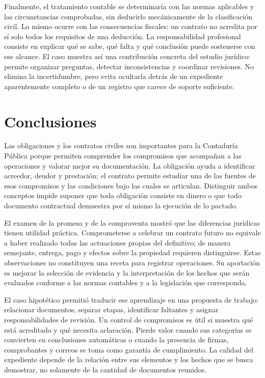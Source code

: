{Finalmente, el tratamiento contable se determinaría con las normas aplicables y las circunstancias comprobadas, sin deducirlo mecánicamente de la clasificación civil. Lo mismo ocurre con las consecuencias fiscales: un contrato no acredita por sí solo todos los requisitos de una deducción. La responsabilidad profesional consiste en explicar qué se sabe, qué falta y qué conclusión puede sostenerse con ese alcance. El caso muestra así una contribución concreta del estudio jurídico: permite organizar preguntas, detectar inconsistencias y coordinar revisiones. No elimina la incertidumbre, pero evita ocultarla detrás de un expediente aparentemente completo o de un registro que carece de soporte suficiente.

\clearpage
\section*{Conclusiones}

Las obligaciones y los contratos civiles son importantes para la Contaduría Pública porque permiten comprender los compromisos que acompañan a las operaciones y valorar mejor su documentación. La obligación ayuda a identificar acreedor, deudor y prestación; el contrato permite estudiar una de las fuentes de esos compromisos y las condiciones bajo las cuales se articulan. Distinguir ambos conceptos impide suponer que toda obligación consiste en dinero o que todo documento contractual demuestra por sí mismo la ejecución de lo pactado.

El examen de la promesa y de la compraventa mostró que las diferencias jurídicas tienen utilidad práctica. Comprometerse a celebrar un contrato futuro no equivale a haber realizado todas las actuaciones propias del definitivo; de manera semejante, entrega, pago y efectos sobre la propiedad requieren distinguirse. Estas observaciones no constituyen una receta para registrar operaciones. Su aportación es mejorar la selección de evidencia y la interpretación de los hechos que serán evaluados conforme a las normas contables y a la legislación que corresponda.

El caso hipotético permitió traducir ese aprendizaje en una propuesta de trabajo: relacionar documentos, separar etapas, identificar faltantes y asignar responsabilidades de revisión. Un control de compromisos es útil si muestra qué está acreditado y qué necesita aclaración. Pierde valor cuando sus categorías se convierten en conclusiones automáticas o cuando la presencia de firmas, comprobantes y correos se toma como garantía de cumplimiento. La calidad del expediente depende de la relación entre sus elementos y los hechos que se busca demostrar, no solamente de la cantidad de documentos reunidos.

}
